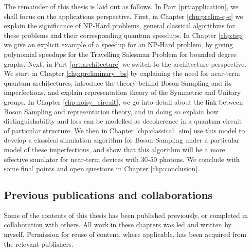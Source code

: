 The remainder of this thesis is laid out as follows. In Part \ref{prt:application}, we shall focus on the applications perspective. First, in Chapter \ref{chp:prelim-q-c} we explain the significance of NP-Hard problems, general classical algorithms for these problems and their corresponding quantum speedups. In Chapter \ref{chp:tsp} we give an explicit example of a speedup for an NP-Hard problem, by giving polynomial speedups for the Travelling Salesman Problem for bounded degree graphs. Next, in Part \ref{prt:architecture} we switch to the architecture perspective. We start in Chapter \ref{chp:preliminary_bs} by explaining the need for near-term quantum architectures, introduce the theory behind Boson Sampling and its imperfections, and explain representation theory of the Symmetric and Unitary groups. In Chapter \ref{chp:noisy_circuit}, we go into detail about the link between Boson Sampling and representation theory, and in doing so explain how distinguishability and loss can be modelled as decoherence in a quantum circuit of particular structure. We then in Chapter \ref{chp:classical_sim} use this model to develop a classical simulation algorithm for Boson Sampling under a particular model of these imperfections, and show that this algorithm will be a more effective simulator for near-term devices with 30-50 photons. We conclude with some final points and open questions in Chapter \ref{chp:conclusion}.

\subsection{Previous publications and collaborations}

Some of the contents of this thesis has been published previously, or completed in collaboration with others. All work in these chapters was led and written by myself. Permission for reuse of content, where applicable, has been acquired from the relevant publishers.

